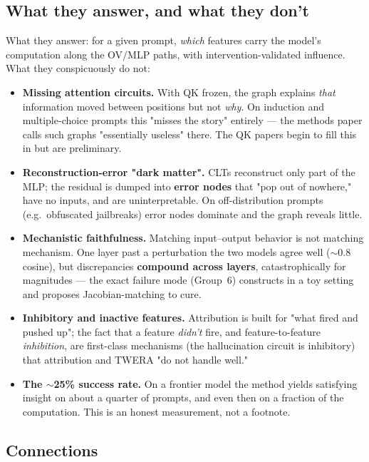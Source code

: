 \subsection*{What they answer, and what they don't}

What they answer: for a given prompt, \emph{which} features carry the model's computation along the OV/MLP paths, with intervention-validated influence. What they conspicuously do not:

\begin{itemize}[leftmargin=1.4em,itemsep=2pt]
\item \textbf{Missing attention circuits.} With QK frozen, the graph explains \emph{that} information moved between positions but not \emph{why}. On induction and multiple-choice prompts this "misses the story" entirely --- the methods paper calls such graphs "essentially useless" there. The QK papers begin to fill this in but are preliminary.
\item \textbf{Reconstruction-error "dark matter".} CLTs reconstruct only part of the MLP; the residual is dumped into \textbf{error nodes} that "pop out of nowhere," have no inputs, and are uninterpretable. On off-distribution prompts (e.g.\ obfuscated jailbreaks) error nodes dominate and the graph reveals little.
\item \textbf{Mechanistic faithfulness.} Matching input--output behavior is not matching mechanism. One layer past a perturbation the two models agree well ($\sim$0.8 cosine), but discrepancies \textbf{compound across layers}, catastrophically for magnitudes --- the exact failure mode \textcite{toy-model-of-mechanistic-unfaithfulness} (Group~6) constructs in a toy setting and proposes Jacobian-matching to cure.
\item \textbf{Inhibitory and inactive features.} Attribution is built for "what fired and pushed up"; the fact that a feature \emph{didn't} fire, and feature-to-feature \emph{inhibition}, are first-class mechanisms (the hallucination circuit is inhibitory) that attribution and TWERA "do not handle well."
\item \textbf{The $\sim$25\% success rate.} On a frontier model the method yields satisfying insight on about a quarter of prompts, and even then on a fraction of the computation. This is an honest measurement, not a footnote.
\end{itemize}

\subsection*{Connections}

